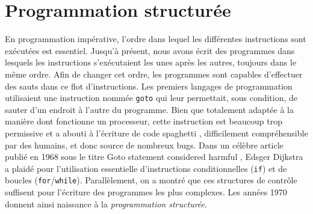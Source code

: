 \documentclass{magnolia}
\begin{document}







\section{Programmation structurée}

En programmation impérative, l'ordre dans lequel les différentes instructions sont
exécutées est essentiel. Jusqu'à présent, nous avons écrit des programmes dans lesquels
les instructions s'exécutaient les unes après les autres, toujours dans le même ordre.
Afin de changer cet ordre, les programmes sont
capables d'effectuer des sauts dans ce flot d'instructions. Les premiers langages de
programmation utilisaient une instruction nommée \verb_goto_ qui leur permettait,
sous condition, de sauter d'un endroit à l'autre du programme. Bien que totalement
adaptée à la manière dont fonctionne un processeur, cette instruction est beaucoup trop
permissive et a abouti à l'écriture de \og code spaghetti \fg, difficilement
compréhensible par des humains, et donc source de nombreux bugs.
Dans un célèbre article publié en 1968 sous le titre \og Goto statement considered harmful \fg,
Edsger Dijkstra a plaidé pour l'utilisation essentielle
d'instructions conditionnelles (\verb_if_) et de boucles (\verb_for_/\verb_while_).
Parallèlement, on a montré que ces structures de contrôle suffisent pour l'écriture des
programmes les plus complexes. Les années 1970 donnent ainsi naissance à la
\emph{programmation structurée}.
\end{document}
